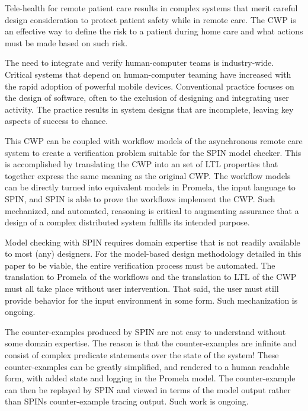 Tele-health for remote patient care results in complex systems that merit careful
design consideration to protect patient safety while in remote care. The CWP is an effective way to define the risk to a patient during home care and what actions must be made based on such risk. 

The need to integrate and verify human-computer teams is industry-wide. Critical systems that depend on human-computer teaming have increased with the rapid adoption of powerful mobile devices. Conventional practice focuses on the design of software, often to the exclusion of designing and integrating user activity. The practice results in system designs that are incomplete, leaving key aspects of success to chance.

This CWP can be coupled with workflow models of the asynchronous remote care system to create a verification problem suitable for the SPIN model checker. This is accomplished by translating the CWP into an set of LTL properties that together express the same meaning as the original CWP. The workflow models can be directly turned into equivalent models in Promela, the input language to SPIN, and SPIN is able to prove the workflows implement the CWP. Such mechanized, and automated, reasoning is critical to augmenting assurance that a design of a complex distributed system fulfills its intended purpose. 

Model checking with SPIN requires domain expertise that is not readily available to most (any) designers. For the model-based design methodology detailed in this paper to be viable, the entire verification process must be automated. The translation to Promela of the workflows and the translation to LTL of the CWP must all take place without user intervention. That said, the user must still provide behavior for the input environment in some form. Such mechanization is ongoing.

The counter-examples produced by SPIN are not easy to understand without some domain expertise. The reason is that the counter-examples are infinite and consist of complex predicate statements over the state of the system! These counter-examples can be greatly simplified, and rendered to a human readable form, with added state and logging in the Promela model. The counter-example can then be replayed by SPIN and viewed in terms of the model output rather than SPINs counter-example tracing output. Such work is ongoing.

